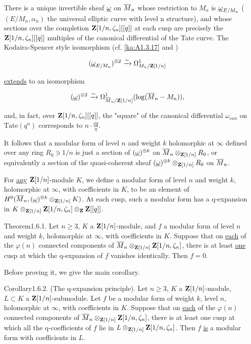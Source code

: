 
There is a unique invertible sheaf $\underline{\omega}$ on $\overline{M}_n$ whose restriction to $M_n$
is $\underline{\omega}_{E/M_n}$ ($(E/M_n,\alpha_n)$ the universal elliptic curve with level n
structure), and whose sections over the completion $\mathbf{Z}[1/n,\zeta_n][[q]]$ at
each cusp are precisely the $\mathbf{Z}[1/n,\zeta_n][[q]]$ multiples of the canonical
differential of the Tate curve. The Kodaira-Spencer style isomorphism (cf.
\ref{ka:A1.3.17} and \cite{deligne69})

\[
(\underline{\omega}_{E/M_n})^{\otimes 2}\xrightarrow{\sim}\Omega^1_{M_n/\mathbf{Z}[1/n]}
\]

\uline{extends} to an isomorphism

\[
(\underline{\omega})^{\otimes 2}\xrightarrow{\sim}\Omega^1_{\overline{M}_n/\mathbf{Z}[1/n]}(\log(\overline{M}_n-M_n)),
\]

and, in fact, over $\mathbf{Z}[1/n,\zeta_n][[q]]$, the "square" of the canonical
differential $\omega_{can}$ on $\mathrm{Tate}(q^n)$ corresponds to
$n\cdot\frac{\dd q}{q}$.

It follows that a modular form of level $n$ and weight $k$ holomorphic at
$\infty$ defined over any ring $R_0\ni 1/n$ is just a section of
$(\underline{\omega})^{\otimes k}$ on $\overline{M}_n\otimes_{\mathbf{Z}[1/n]}R_0$, or equivalently a section of
the quasi-coherent sheaf $(\underline{\omega})^{\otimes k}\otimes_{\mathbf{Z}[1/n]}R_0$ on $\overline{M}_n$.


For \uline{any} $\mathbf{Z}[1/n]$-module $K$, we define a modular form of level $n$ and
weight $k$, holomorphic at $\infty$, with coefficients in $K$, to be an element
of $H^0(\overline{M}_n,(\underline{\omega})^{\otimes k}\otimes_{\mathbf{Z}[1/n]}K)$. At each cusp, such a
modular form has a q-expansion in
$K\otimes_{\mathbf{Z}[1/n]}\mathbf{Z}[1/n,\zeta_n]\otimes_{\mathbf{Z}}\mathbf{Z}[[q]]$.

\begin{kathm}{Theorem}{1.6.1.}
Let $n\geq 3$, $K$ a $\mathbf{Z}[1/n]$-module, and $f$ a modular form of level $n$ and
weight $k$, holomorphic at $\infty$, with coefficients in $K$. Suppose that on
\uline{each} of the $\varphi(n)$ connected components of
$\overline{M}_n\otimes_{\mathbf{Z}[1/n]}\mathbf{Z}[1/n,\zeta_n]$, there is at least \uline{one} cusp at
which the q-expansion of $f$ vanishes identically. Then $f = 0$.
\end{kathm}

Before proving it, we give the main corollary.

\begin{kathm}{Corollary}{1.6.2.}
(The q-expansion principle). Let $n\geq 3$, $K$ a $\mathbf{Z}[1/n]$-module, $L\subset K$
a $\mathbf{Z}[1/n]$-submodule. Let $f$ be a modular form of weight $k$, level $n$,
holomorphic at $\infty$, with coefficients in $K$. Suppose that on \uline{each}
of the $\varphi(n)$ connected components of
$\overline{M}_n\otimes_{\mathbf{Z}[1/n]}\mathbf{Z}[1/n,\zeta_n]$, there is at least one cusp at which all
the q-coefficients of $f$ lie in $L\otimes_{\mathbf{Z}[1/n]}\mathbf{Z}[1/n,\zeta_n]$. Then $f$
\uline{is} a modular form with coefficients in $L$.
\end{kathm}

